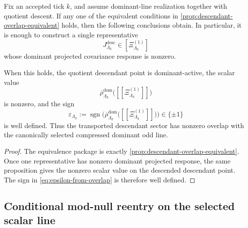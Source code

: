 \documentclass[11pt]{article}
\begin{document}
\begin{theorem}
\label{thm:descendant-overlap}
Fix an accepted tick \(k\), and assume dominant-line realization together with quotient descent.
If any one of the equivalent conditions in \cref{prop:descendant-overlap-equivalent} holds, then the
following conclusions obtain.
In particular, it is enough to construct a single representative
\[
J^{\mathrm{desc}}_{\Lambda_k}\in[\Xi^{(1)}_{\Lambda_k}]
\]
whose dominant projected covariance response is nonzero.

When this holds, the quotient descendant point is dominant-active, the scalar value
\[
\overline{\rho}^{\mathrm{dom}}_{\Lambda_k}\big([\![\Xi^{(1)}_{\Lambda_k}]\!]\big)
\]
is nonzero, and the sign
\begin{equation}
\varepsilon_{\Lambda_k}
:=
\operatorname{sgn}\!\Big(
\overline{\rho}^{\mathrm{dom}}_{\Lambda_k}\big([\![\Xi^{(1)}_{\Lambda_k}]\!]\big)
\Big)
\in\{\pm1\}
\label{eq:epsilon-from-overlap}
\end{equation}
is well defined.
Thus the transported descendant sector has nonzero overlap with the canonically selected compressed
dominant odd line.
\end{theorem}

\begin{proof}
The equivalence package is exactly \cref{prop:descendant-overlap-equivalent}.
Once one representative has nonzero dominant projected response, the same proposition gives the
nonzero scalar value on the descended descendant point. The sign in \eqref{eq:epsilon-from-overlap}
is therefore well defined.
\end{proof}

\subsection*{Conditional mod-null reentry on the selected scalar line}
\label{subsec:conditional-mod-null-reentry}
\end{document}
